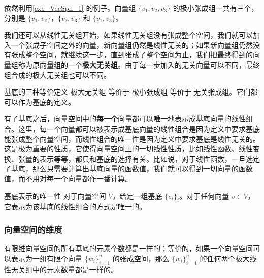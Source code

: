 \begin{example}{}
依然利用\autoref{exe_VecSpn_1} 的例子。向量组 $\{v_1, v_2, v_3\}$ 的极小张成组一共有三个，分别是 $\{v_1, v_2\}$，$\{v_2, v_3\}$ 和 $\{v_1, v_3\}$。
\end{example}

我们还可以从线性无关组开始，如果线性无关组没有张成整个空间，我们就可以加入一个张成子空间之外的向量，新向量组仍然是线性无关的；如果新向量组仍然没有张成整个空间，就继续这一步，直到张成了整个空间为止，我们把最终得到的向量组称为原向量组的一个\textbf{极大无关组}。由于每一步加入的无关向量可以不同，最终组合成的极大无关组也可以不同。

\begin{theorem}{基底的三种等价定义}
极大无关组 等价于 极小张成组 等价于 无关张成组。它们都可以作为基底的定义。
\end{theorem}


有了基底之后，向量空间中的\textbf{每一个}向量都可以\textbf{唯一}地表示成基底向量的线性组合。这里，每一个向量都可以被表示成基底向量的线性组合是因为定义中要求基底能张成整个向量空间，而线性组合的唯一性是因为定义中要求基底是线性无关的。这是极为重要的性质，它使得向量空间上的一切线性性质，比如线性函数、线性变换、张量的表示等等，都只和基底的选择有关。比如说，对于线性函数，一旦选定了基底，那么只需要计算出基底向量的函数值，我们就可以得到一切向量的函数值，而不用对每一个向量都作一番计算。

\begin{theorem}{基底表示的唯一性}\label{the_VecSpn_1}
对于向量空间 $V$，给定一组基底 $\{e_i\}_i$。对于任何向量 $v\in V$，它表示为该基底的线性组合的方式是唯一的。
\end{theorem}

\subsubsection{向量空间的维度}
% 


\begin{theorem}{}\label{the_VecSpn_2}
有限维向量空间的所有基底的元素个数都是一样的；等价的，如果一个向量空间可以表示为一组有限个向量 $\{w_i\}_{i = 1}^n$ 的张成空间，那么 $\{w_i\}_{i = 1}^n$ 的任何两个极大线性无关组中的元素数量都是一样的。
\end{theorem}

